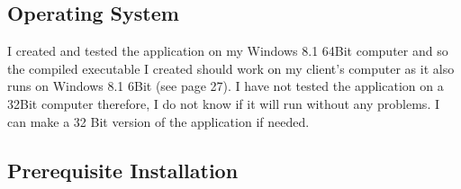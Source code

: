 \subsection{Operating System}

I created and tested the application on my Windows 8.1 64Bit computer and so the compiled executable I created should work on my client's computer as it also runs on Windows 8.1 6Bit (see page 27). I have not tested the application on a 32Bit computer therefore, I do not know if it will run without any problems. I can make a 32 Bit version of the application if needed.


\subsection{Prerequisite Installation}

